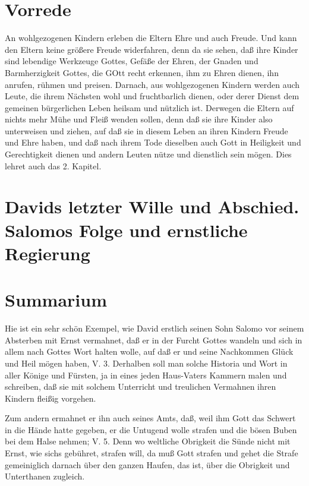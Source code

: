 \section{Vorrede}

An wohlgezogenen Kindern erleben die Eltern Ehre und auch Freude. Und kann den Eltern keine größere Freude widerfahren, denn da sie sehen, daß ihre Kinder sind lebendige Werkzeuge Gottes, Gefäße der Ehren, der Gnaden und Barmherzigkeit Gottes, die GOtt recht erkennen, ihm zu Ehren dienen, ihn anrufen, rühmen und preisen. Darnach, aus wohlgezogenen Kindern werden auch Leute, die ihrem Nächsten wohl und fruchtbarlich dienen, oder derer Dienst dem gemeinen bürgerlichen Leben heilsam und nützlich ist. Derwegen die Eltern auf nichts mehr Mühe und Fleiß wenden sollen, denn daß sie ihre Kinder also unterweisen und ziehen, auf daß sie in diesem Leben an ihren Kindern Freude und Ehre haben, und daß nach ihrem Tode dieselben auch Gott in Heiligkeit und Gerechtigkeit dienen und andern Leuten nütze und dienstlich sein mögen. Dies lehret auch das 2. Kapitel.

\section[Davids letzter Wille und Abschied. Salomos Folge und]{Davids letzter Wille und Abschied. Salomos Folge und ernstliche Regierung}

\section{Summarium}

Hie ist ein sehr schön Exempel, wie David erstlich seinen Sohn Salomo vor seinem Absterben mit Ernst vermahnet, daß er in der Furcht Gottes wandeln und sich in allem nach Gottes Wort halten wolle, auf daß er und seine Nachkommen Glück und Heil mögen haben, V. 3. Derhalben soll man solche Historia und Wort in aller Könige und Fürsten, ja in eines jeden Haus-Vaters Kammern malen und schreiben, daß sie mit solchem Unterricht und treulichen Vermahnen ihren Kindern fleißig vorgehen.

Zum andern ermahnet er ihn auch seines Amts, daß, weil ihm Gott das Schwert in die Hände hatte gegeben, er die Untugend wolle strafen und die bösen Buben bei dem Halse nehmen; V. 5. Denn wo weltliche Obrigkeit die Sünde nicht mit Ernst, wie sichs gebühret, strafen will, da muß Gott strafen und gehet die Strafe gemeiniglich darnach über den ganzen Haufen, das ist, über die Obrigkeit und Unterthanen zugleich.

